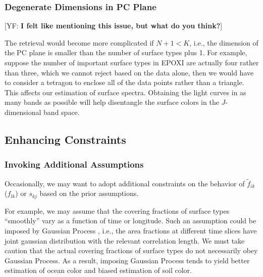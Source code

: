 \documentclass[iop,numberedappendix,apj,]{emulateapj}
\def\fast{\tilde f}
\def\memoYF#1{\color{red}[YF: {\bf #1}]\color{black}}
\begin{document}
\subsubsection{Degenerate Dimensions in PC Plane}

\memoYF{I felt like mentioning this issue, but what do you think?}

The retrieval would become more complicated if $N + 1 < K$, i.e., the dimension of the PC plane is smaller than the number of surface types plus 1. 
For example, suppose the number of important surface types in EPOXI are actually four rather than three, which we cannot reject based on the data alone, then we would have to consider a tetragon to enclose all of the data points rather than a triangle. 
This affects our estimation of surface spectra. 
Obtaining the light curves in as many bands as possible will help disentangle the surface colors in the $J$-dimensional band space. 


\subsection{Enhancing Constraints}
\label{ss:enhancing_constraints}

\subsubsection{Invoking Additional Assumptions}

Occasionally, we may want to adopt additional constraints on the behavior of $\fast _{ik}$ ($f_{lk}$) or $s_{kj}$ based on the prior assumptions. 

For example, we may assume that the covering fractions of surface types  ``smoothly'' vary as a function of time or longitude. 
Such an assumption could be imposed by Gaussian Process \citep[e.g.,][]{Rasmussen2005}, i.e., the area fractions at different time slices have joint gaussian distribution with the relevant correlation length. 
We must take caution that the actual covering fractions of surface types do not necessarily obey Gaussian Process. 
As a result, imposing Gaussian Process tends to yield better estimation of ocean color and biased estimation of soil color. 
\end{document}
